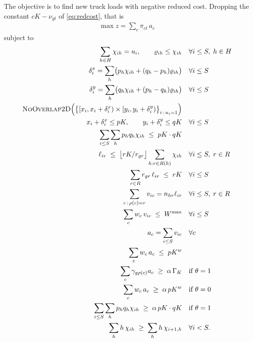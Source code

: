 The objective is to find new truck loads with negative reduced cost.
Dropping the constant $cK-\nu_{gt}$ of \eqref{eq:redcost}, that is
\begin{align}
    \max z = \sum_{c}\pi_{ct}\,a_{c}
    \label{eq:PPObjective}
\end{align}
subject to
\begin{align}
 \sum_{h\in H}\chi_{ih}=u_{i},\qquad \varrho_{ih}\le\chi_{ih}
   \quad & \forall i\le S,\;h\in H \label{eq:PPtype}\\
 \delta^{x}_{i}=\sum_{h}\bigl(p_{h}\chi_{ih}+(q_{h}-p_{h})\varrho_{ih}\bigr)
   \quad & \forall i\le S \label{eq:PPdimx}\\
 \delta^{y}_{i}=\sum_{h}\bigl(q_{h}\chi_{ih}+(p_{h}-q_{h})\varrho_{ih}\bigr)
   \quad & \forall i\le S \label{eq:PPdimy}\\
 \textsc{NoOverlap2D}\Bigl(\bigl\{[x_{i},x_{i}+\delta^{x}_{i})\times
   [y_{i},y_{i}+\delta^{y}_{i})\bigr\}_{i\,:\,u_{i}=1}\Bigr)
   \quad & \label{eq:PPnooverlap}\\
 x_{i}+\delta^{x}_{i}\le pK,\qquad y_{i}+\delta^{y}_{i}\le qK
   \quad & \forall i\le S \label{eq:PPcontain}\\
 \sum_{i\le S}\sum_{h} p_{h}q_{h}\chi_{ih}\;\le\;pK\cdot qK
   \quad & \label{eq:PParea}\\
 \ell_{ir}\;\le\;\bigl\lfloor rK/r_{gr}\bigr\rfloor
   \sum_{h:r\in R(h)}\chi_{ih}
   \quad & \forall i\le S,\;r\in R \label{eq:PPlayercompat}\\
 \sum_{r\in R} r_{gr}\,\ell_{ir}\;\le\;rK
   \quad & \forall i\le S \label{eq:PPheight}\\
 \sum_{c\,:\,\rho(c)=r} v_{ic}=n_{hr}\ell_{ir}
   \quad & \forall i\le S,\;r\in R \label{eq:PPassign}\\
 \sum_{c} w_{c}\,v_{ic}\;\le\;W^{\max}
   \quad & \forall i\le S \label{eq:PPcrush}\\
 a_{c}=\sum_{i\le S} v_{ic}
   \quad & \forall c \label{eq:PPagg}\\
 \sum_{c} w_{c}\,a_{c}\;\le\;pK^{w}
   \quad & \label{eq:PPpayload}\\
 \sum_{c}\gamma_{g\rho(c)}a_{c}\;\ge\;\alpha\,\Gamma_{K}
   \quad & \text{if }\theta=1 \label{eq:PPftlvol}\\
 \sum_{c} w_{c}\,a_{c}\;\ge\;\alpha\,pK^{w}
   \quad & \text{if }\theta=0 \label{eq:PPftlwgt}\\
 \sum_{i\le S}\sum_{h} p_{h}q_{h}\chi_{ih}\;\ge\;\alpha\,pK\cdot qK
   \quad & \text{if }\theta=1 \label{eq:PPareacut}\\
 \sum_{h}h\,\chi_{ih}\;\ge\;\sum_{h}h\,\chi_{i+1,h}
   \quad & \forall i<S. \label{eq:PPsymm}
\end{align}
